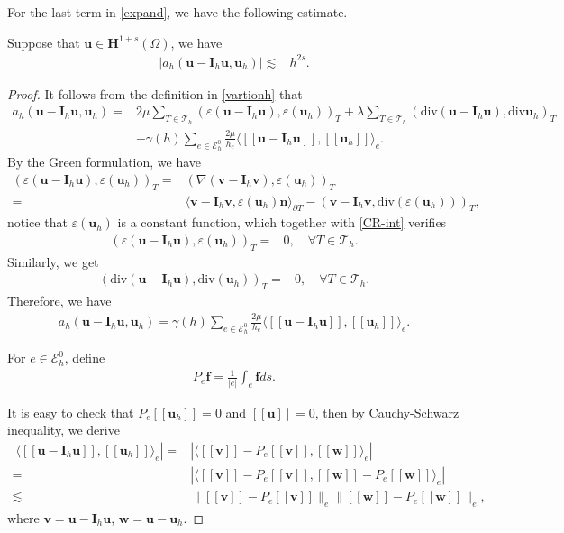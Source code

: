 \documentclass[leqno,CJK]{siamltex704}
\numberwithin{equation}{section}
\def\E{{\mathcal{E}}}
\def\T{{\mathcal{T}}}
\def\sumT{\sum_{T\in\mathcal{T}_h}}     %
\def\bw{{\mathbf{w}}}
\def\bu{{\mathbf{u}}}
\def\bv{{\mathbf{v}}}
\def\bh{{\mathbf{H}}}
\def\bi{{\mathbf{I}}}
\def\bn{{\mathbf{n}}}
\def\bf{{\mathbf{f}}}
\newcommand{\eps}{\varepsilon}
\newcommand{\di}{\text{div}}
\newcommand{\la}{\langle}
\newcommand{\ra}{\rangle_{\partial T}}
\begin{document}
For the last term in \eqref{expand}, we have the following estimate.
\begin{theorem}
	Suppose that $\bu\in\bh^{1+s}(\Omega)$, we have
	\begin{align}\label{lb1}
		|a_h(\bu-\bi_h\bu,\bu_h)|\lesssim&h^{2s}.
	\end{align}
\end{theorem}
\begin{proof} It follows from the definition in \eqref{vartionh} that
	\begin{align*}
		a_h(\bu-\bi_h\bu,\bu_h)=&2\mu\sumT(\eps(\bu-\bi_h\bu),\eps(\bu_h))_T +\lambda\sumT(\di(\bu-\bi_h\bu),\di\bu_h)_T\\
		\quad&+\gamma(h)\sum\limits_{e\in\E_h^0}\frac{2\mu}{h_e}\langle[\![\bu-\bi_h\bu]\!],[\![\bu_h]\!]\rangle_e.
	\end{align*}
	By the Green formulation, we have
	\begin{align*}
		(\eps(\bu-\bi_h\bu),\eps(\bu_h))_T=&(\nabla(\bv-\bi_h\bv),\eps(\bu_h))_T
		\\
		=&\la\bv-\bi_h\bv,\eps(\bu_h)\bn\ra-(\bv-\bi_h\bv,\di(\eps(\bu_h)))_T,
	\end{align*}
	notice that $\eps(\bu_h)$ is a constant function, which together with \eqref{CR-int} verifies
	\begin{align*}
		(\eps(\bu-\bi_h\bu),\eps(\bu_h))_T=&0,\quad\forall T\in\T_h.
	\end{align*}
	Similarly, we get
	\begin{align*}
		(\di(\bu-\bi_h\bu),\di(\bu_h))_T=&0,\quad\forall T\in\T_h.
	\end{align*}
	Therefore, we have
	\begin{eqnarray}\label{ahM}
		a_h(\bu-\bi_h\bu,\bu_h)=\gamma(h)\sum\limits_{e\in\E_h^0}\frac{2\mu}{h_e}\langle[\![\bu-\bi_h\bu]\!],[\![\bu_h]\!]\rangle_e.
	\end{eqnarray}
	
	For $e\in\E_h^0$, define
	\begin{eqnarray*}
		P_e\bf=\frac{1}{|e|}\int_e\bf ds.
	\end{eqnarray*}
	
	 It is easy to check that $P_e[\![\bu_h]\!]=0$ and $[\![\bu]\!]=0$, then by Cauchy-Schwarz inequality, we derive
	\begin{align}\label{ahM2}
		|\langle[\![\bu-\bi_h\bu]\!],[\![\bu_h]\!]\rangle_e|=&
		|\langle[\![\bv]\!]-P_e[\![\bv]\!],[\![\bw]\!]\rangle_e|\nonumber
		\\
		=&|\langle[\![\bv]\!]-P_e[\![\bv]\!],[\![\bw]\!]-P_e[\![\bw]\!]\rangle_e|
		\\
		\lesssim&\big\|[\![\bv]\!]-P_e[\![\bv]\!]\big\|_e\big\|[\![\bw]\!]-P_e[\![\bw]\!]\big\|_e\nonumber,
	\end{align}
	where $\bv=\bu-\bi_h\bu$, $\bw=\bu-\bu_h$.
	

\end{proof}
\end{document}

